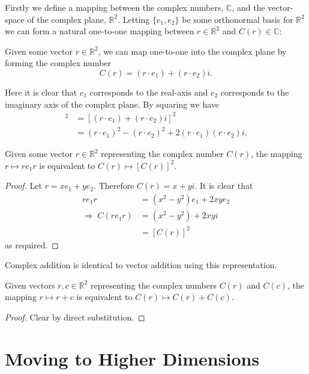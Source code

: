 Firstly we define a mapping between the complex numbers, $\mathbb{C}$, and
the vector-space of the complex plane, $\mathbb{R}^2$. Letting $\{e_1, e_2\}$
be some orthonormal basis for $\mathbb{R}^2$ we can form a natural one-to-one
mapping between $r \in \mathbb{R}^2$ and $C(r) \in \mathbb{C}$:

\begin{definition}
Given some vector $r \in \mathbb{R}^2$, we can map one-to-one into the
complex plane by forming the complex number
\[
C(r) = (r \cdot e_1) + (r \cdot e_2)i.
\]
\end{definition}

Here it is clear that $e_1$ corresponds to the real-axis and $e_2$ 
corresponds to the imaginary axis of the complex plane.
By squaring we have
\begin{align*}
[C(r)]^2 &= [(r \cdot e_1) + (r \cdot e_2)i]^2 \\
       &= (r \cdot e_1)^2 - (r \cdot e_2)^2 + 2(r \cdot e_1)(r \cdot e_2)i.
\end{align*}

\begin{lemma}
Given some vector $r \in \mathbb{R}^2$ representing the complex number
$C(r)$, the mapping $r \mapsto re_1r$ is equivalent to $C(r) \mapsto [C(r)]^2$.
\end{lemma}
\begin{proof}
Let $r = xe_1 + ye_2$. Therefore $C(r) = x + yi$. It is clear that
\begin{align*}
re_1r &= (x^2 - y^2) e_1 + 2xye_2 \\
\Rightarrow\;C(re_1r) &= (x^2 - y^2) + 2xyi\\
        &= [C(r)]^2
\end{align*}
as required.
\end{proof}

Complex addition is identical to vector addition using this representation.
\begin{lemma}
Given vectors $r, c \in \mathbb{R}^2$ representing the complex numbers
$C(r)$ and $C(c)$, the mapping $r \mapsto r + c$ is equivalent to 
$C(r) \mapsto C(r) + C(c)$.
\end{lemma}
\begin{proof}
Clear by direct substitution.
\end{proof}

\section{Moving to Higher Dimensions}

